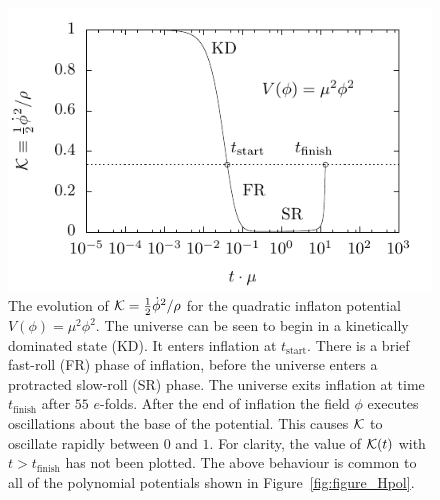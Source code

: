 \begin{figure}[tp]
  \includegraphics[width=\textwidth]{chapters/kinetic_dominance/figures/Kpol} 
  \caption{The evolution of \(\mathcal{K} = \frac{1}{2}\dot{\phi}^2/\rho\) for the quadratic inflaton potential \(V(\phi) = \mu^2 \phi^2\).  The universe can be seen to begin in a kinetically dominated state (KD).  It enters inflation at \(t_\mathrm{start}\). There is a brief fast-roll (FR) phase of inflation, before the universe enters a protracted slow-roll (SR) phase. The universe exits inflation at time \(t_\mathrm{finish}\) after \(55\) \(e\)-folds. After the end of inflation the field \(\phi\) executes oscillations about the base of the potential. This causes \(\mathcal{K}\) to oscillate rapidly between \(0\) and \(1\). For clarity, the value of \(\mathcal{K}(t)\) with \(t>t_\mathrm{finish}\) has not been plotted. The above behaviour is common to all of the  polynomial potentials shown in Figure~\protect\ref{fig:figure_Hpol}.}\label{fig:figure_Kpol}
\end{figure}

